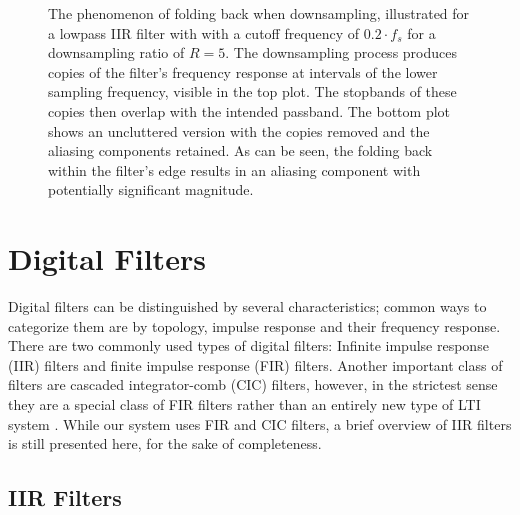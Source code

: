 \begin{figure}
    \centering
    
    \caption[Folding Back of Stopband Components Into Passband]{%
        The phenomenon  of folding back  when downsampling, illustrated  for a
        lowpass IIR filter with with a  cutoff frequency of $0.2\cdot f_s$ for
        a  downsampling  ratio  of $R=5$.\protect\newline
        The  downsampling process  produces copies  of the  filter's frequency
        response at intervals of the  lower sampling frequency, visible in the
        top  plot.   The stopbands  of  these  copies  then overlap  with  the
        intended passband.\protect\newline
        The bottom plot  shows an uncluttered version with  the copies removed
        and the aliasing components retained.\protect\newline
        As can be seen, the folding back within the filter's edge results in
        an aliasing component with potentially significant magnitude.%
    }
    \label{fig:aliasing:iirCopies}
\end{figure}


\section{Digital Filters}%
\label{sec:digital_filters}

Digital filters can  be distinguished by several  characteristics; common ways
to  categorize them  are by  topology,  impulse response  and their  frequency
response. There  are  two commonly  used  types  of digital  filters: Infinite
impulse   response   (IIR)  filters   and   finite   impulse  response   (FIR)
filters. Another important class of filters are cascaded integrator-comb (CIC)
filters,  however, in  the strictest  sense they  are a  special class  of FIR
filters rather than an entirely new  type of LTI system \cite{1163535}.  While
our system uses FIR and CIC filters,  a brief overview of IIR filters is still
presented here, for the sake of completeness.

\subsection{IIR Filters} %
\label{subsec:iir_filters}


